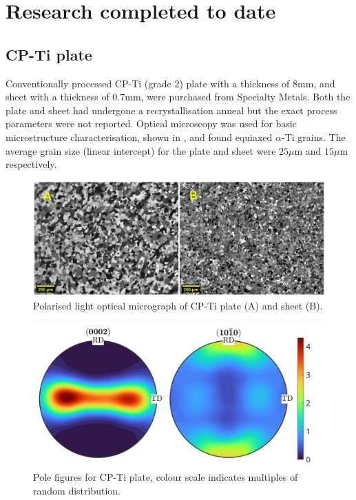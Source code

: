 \chapter{Research completed to date}

\section{CP-Ti plate}
Conventionally processed CP-Ti (grade 2) plate with a thickness of 8mm, and sheet with a thickness of 0.7mm, were purchased from Specialty Metals.
Both the plate and sheet had undergone a recrystallisation anneal but the exact process parameters were not reported.
Optical microscopy was used for basic microstructure characterisation, shown in , and found equiaxed $\alpha$-Ti grains.
The average grain size (linear intercept) for the plate and sheet were $25\mu$m and $15\mu$m respectively.

\begin{figure}[h]
\centering
  \includegraphics[width=\textwidth]{Figures/plate_sheet_OM.jpg}
  \caption{Polarised light optical micrograph of CP-Ti plate (A) and sheet (B). \label{fig.plateSheetOM}}
\end{figure}

\begin{figure}[h]
\centering
  \includegraphics[width=\textwidth]{Figures/pf_plate_axisCorrectedjpg.jpg}
  \caption{Pole figures for CP-Ti plate, colour scale indicates multiples of random distribution. \label{fig.pfPlate}}
\end{figure}

